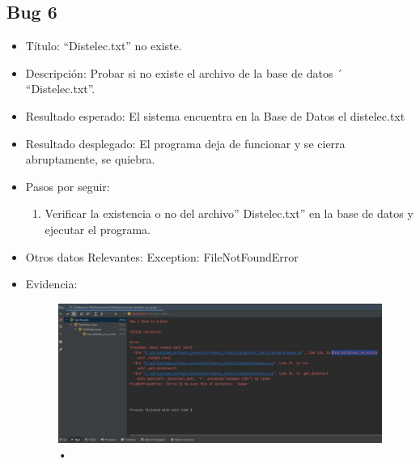 \documentclass[conference]{IEEEtran}
\begin{document}
\subsection*{Bug 6}
\begin{itemize}
\item Título: “Distelec.txt” no existe.

\item Descripción: Probar si no existe el archivo de la base de datos ´ “Distelec.txt”.

\item Resultado esperado: El sistema encuentra en la Base de Datos el distelec.txt

\item Resultado desplegado: El programa deja de funcionar y se cierra abruptamente, se quiebra. 

\item Pasos por seguir: 
\begin{enumerate}
\item Verificar la existencia o no del archivo” Distelec.txt” en la base de datos y ejecutar el programa.
\end{enumerate}

\item Otros datos Relevantes: Exception: FileNotFoundError
\item Evidencia:
\begin{figure}[H]
\centering
\includegraphics[scale=0.2]{imagenes/distelect_no_existe.jpeg}
\caption{•}
\end{figure}

\end{itemize}
\end{document}
